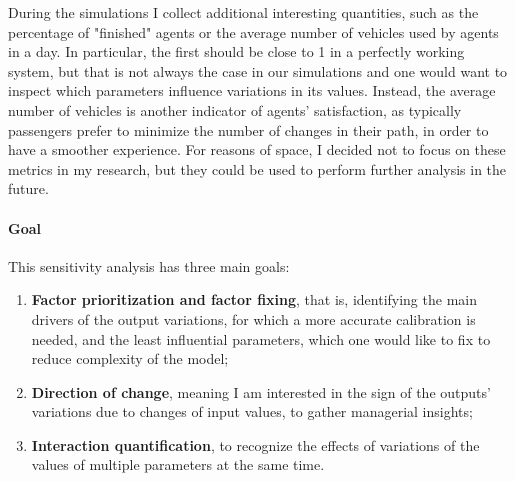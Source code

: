 During the simulations I collect additional interesting quantities, such as the percentage of "finished" agents or the average number of vehicles used by agents in a day. In particular, the first should be close to 1 in a perfectly working system, but that is not always the case in our simulations and one would want to inspect which parameters influence variations in its values. Instead, the average number of vehicles is another indicator of agents' satisfaction, as typically passengers prefer to minimize the number of changes in their path, in order to have a smoother experience. For reasons of space, I decided not to focus on these metrics in my research, but they could be used to perform further analysis in the future.


\paragraph{Goal}
This sensitivity analysis has three main goals:
\begin{enumerate}
    \item \textbf{Factor prioritization and factor fixing}, that is, identifying the main drivers of the output variations, for which a more accurate calibration is needed, and the least influential parameters, which one would like to fix to reduce complexity of the model;
    \item \textbf{Direction of change}, meaning I am interested in the sign of the outputs' variations due to changes of input values, to gather managerial insights;
    \item \textbf{Interaction quantification}, to recognize the effects of variations of the values of multiple parameters at the same time. 
\end{enumerate}


